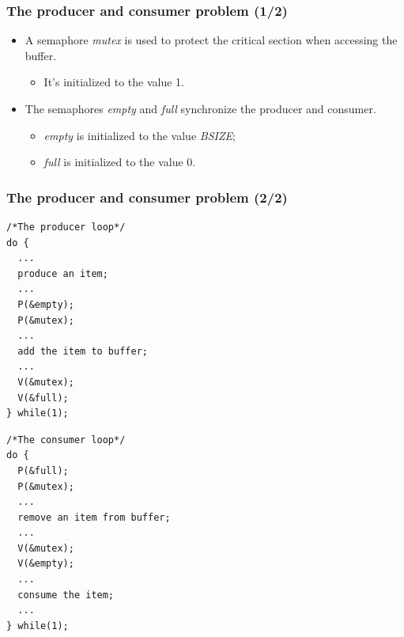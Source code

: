 \documentclass[CJKutf8,xcolor=pdftex,dvipsnames,table]{beamer}
\begin{document}
\begin{CJK*}{UTF8}{song}
  \begin{frame}
  \frametitle{The producer and consumer problem (1/2)} \pause
  \begin{itemize}
  \item{A semaphore \emph{mutex} is used to protect the critical section when accessing the buffer.} \pause
    \begin{itemize}
    \item{It's initialized to the value 1.} \pause
    \end{itemize}
  \item{The semaphores \emph{empty} and \emph{full} synchronize the producer
    and consumer.} \pause
    \begin{itemize}
    \item{\emph{empty} is initialized to the value \emph{BSIZE};} \pause
    \item{\emph{full} is initialized to the value 0.}
    \end{itemize}
  \end{itemize}
  \end{frame}

  \begin{frame}[fragile]
  \frametitle{The producer and consumer problem (2/2)} \pause
  \begin{minipage}[c]{0.5\textwidth}

\begin{lstlisting}
/*The producer loop*/
do {
  ...
  produce an item;
  ...
  P(&empty);
  P(&mutex);
  ...
  add the item to buffer;
  ...
  V(&mutex);
  V(&full);
} while(1);
\end{lstlisting}

  \end{minipage}%
  \pause
  \begin{minipage}[c]{0.5\textwidth}

\begin{lstlisting}
/*The consumer loop*/
do {
  P(&full);
  P(&mutex);
  ...
  remove an item from buffer;
  ...
  V(&mutex);
  V(&empty);
  ...
  consume the item;
  ...
} while(1);
\end{lstlisting}

  \end{minipage}

\end{frame}


\end{CJK*}
\end{document}
